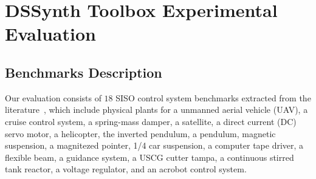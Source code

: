 \documentclass[10pt,conference]{IEEEtran}
\newcommand\tool{{DSSynth Toolbox}\xspace}
\begin{document}
\section{\tool Experimental Evaluation}

\subsection{Benchmarks Description}
\label{benchmarks-description}

Our evaluation consists of $18$ SISO control system benchmarks extracted
from the literature~\cite{abate2017, abatecav2017, bouabdallah, acrobot,
cstr, KOKOTOVIC198023, gajic2008optimal, Franklin15, maglev, converters,
CTMS, DBLP:journals/tc/BessaIPCF17, DBLP:journals/dafes/BessaICF16}, which
include physical plants for a unmanned aerial vehicle (UAV), a cruise
control system, a spring-mass damper, a satellite, a direct current (DC)
servo motor, a helicopter, the inverted pendulum, a pendulum, magnetic
suspension, a magnitezed pointer, 1/4 car suspension, a computer tape
driver, a flexible beam, a guidance system, a USCG cutter tampa, a
continuous stirred tank reactor, a voltage regulator, and an acrobot control
system.
\end{document}
